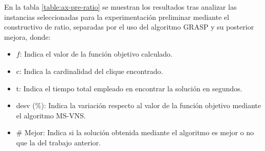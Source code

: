 En la tabla \ref{table:ax-pre-ratio} se muestran los resultados tras analizar las instancias seleccionadas para la experimentación preliminar mediante el constructivo de ratio, separadas por el uso del algoritmo \gls{GRASP} y su posterior mejora, donde:
\begin{itemize}
	\item $f$: Indica el valor de la función objetivo calculado.
	\item c: Indica la cardinalidad del clique encontrado.
	\item t: Indica el tiempo total empleado en encontrar la solución en segundos.
	\item desv (\%): Indica la variación respecto al valor de la función objetivo mediante el algoritmo MS-VNS.
	\item \# Mejor: Indica si la solución obtenida mediante el algoritmo es mejor o no que la del trabajo anterior.
\end{itemize}


